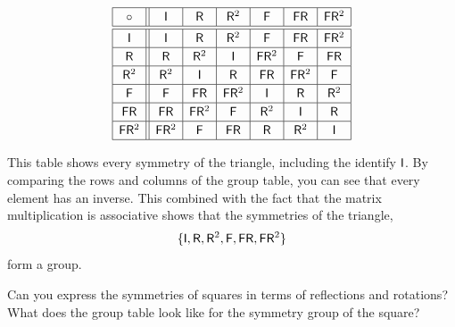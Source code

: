 \[
{
\renewcommand{\arraystretch}{1.2}
\begin{array}{| c || c | c | c |c | c | c |}
\hline
\circ & \mat{I} & \mat{R} & \mat{R}^2  & \mat{F} & \mat{F} \mat{R} &  \mat{F} \mat{R}^2  \\ \hline \hline
\mat{I} & \mat{I} & \mat{R} & \mat{R}^2 & \mat{F} & \mat{F} \mat{R} & \mat{F} \mat{R}^2 \\ \hline
\mat{R} & \mat{R} & \mat{R}^2 & \mat{I} & \mat{F} \mat{R}^2 & \mat{F} & \mat{F} \mat{R} \\ \hline
\mat{R}^2 & \mat{R}^2 & \mat{I} & \mat{R} & \mat{F} \mat{R} & \mat{F} \mat{R}^2 & \mat{F}  \\ \hline
\mat{F} & \mat{F} & \mat{F} \mat{R} & \mat{F} \mat{R}^2 & \mat{I} & \mat{R} & \mat{R}^2 \\ \hline
\mat{F} \mat{R} & \mat{F} \mat{R} & \mat{F} \mat{R}^2 & \mat{F} & \mat{R}^2 & \mat{I} & \mat{R}  \\ \hline
\mat{F} \mat{R}^2 & \mat{F} \mat{R}^2 & \mat{F} & \mat{F} \mat{R} & \mat{R} & \mat{R}^2 & \mat{I}\\ \hline
\end{array}}
\]

This table shows every symmetry of the triangle, including the
identify $\mathsf{I}$. By comparing the rows and columns of the group
table, you can see that every element has an inverse. This combined
with the fact that the matrix multiplication is associative shows that
the symmetries of the triangle,
\[
\{ \mathsf{I},\mathsf{R},\mathsf{R}^2,\mathsf{F},\mathsf{F} \mathsf{R},  \mathsf{F} \mathsf{R}^2\}
\]
form a group.

\begin{ques} 
Can you express the symmetries of squares in terms of reflections
and rotations? What does the group table look like for the symmetry
group of the square?
\end{ques}
\QM



\newpage

